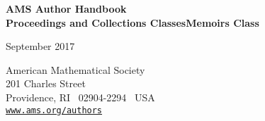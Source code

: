 



\frenchspacing


\thispagestyle{empty}
\vspace*{1.25in}
\noindent
\begin{minipage}[t][5.5in]{\textwidth}
 \centering
 {\Huge\bfseries AMS Author Handbook\\[4pt]
  {Proceedings and Collections Classes}{Memoirs Class}\par}
 \vspace{.5in}
 {\LARGE September 2017}\par
 \vspace{\fill}
 American Mathematical Society\\
 201 Charles Street\\
 Providence, RI \ 02904-2294 \ USA\\[1\baselineskip]
 \href{http://www.ams.org/authors}{\texttt{www.ams.org/authors}}
\end{minipage}

\clearpage

\makeatletter
\@openrightfalse
\makeatother

\tableofcontents

\ifmonograph
 \makeatletter
 \if@openany
 \else \@openrighttrue
 \fi
 \makeatother
\fi

